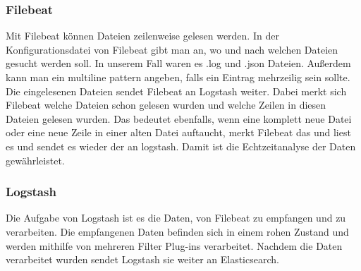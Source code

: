 \subsubsection{Filebeat}
\label{ssub:Filebeat}
Mit Filebeat können Dateien zeilenweise gelesen werden. In der Konfigurationsdatei von Filebeat gibt man an, wo und nach welchen Dateien gesucht werden soll. In unserem Fall waren es .log und .json Dateien. Außerdem kann man ein multiline pattern angeben, falls ein Eintrag mehrzeilig sein sollte. Die eingelesenen Dateien sendet Filebeat an Logstash weiter. Dabei merkt sich Filebeat welche Dateien schon gelesen wurden und welche Zeilen in diesen Dateien gelesen wurden. Das bedeutet ebenfalls, wenn eine komplett neue Datei oder eine neue Zeile in einer alten Datei auftaucht, merkt Filebeat das und liest es und sendet es wieder der an logstash. Damit ist die Echtzeitanalyse der Daten gewährleistet. 

\subsubsection{Logstash}
\label{sub:Logstash}
Die Aufgabe von Logstash ist es die Daten, von Filebeat zu empfangen und zu verarbeiten. Die empfangenen Daten befinden sich in einem rohen Zustand und werden mithilfe von mehreren Filter Plug-ins verarbeitet. Nachdem die Daten verarbeitet wurden sendet Logstash sie weiter an Elasticsearch.\\

